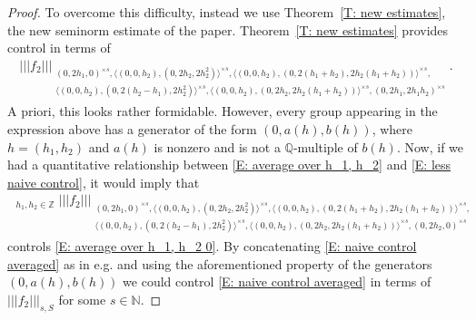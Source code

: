 \documentclass[11pt]{amsart}
\theoremstyle{definition}
\DeclareMathOperator*{\oE}{\overline{\mathbb{E}}}
\newcommand{\N}{{\mathbb N}}
\newcommand{\Q}{{\mathbb Q}}
\newcommand{\Z}{{\mathbb Z}}
\newcommand{\nnorm}[1]{\lvert\!|\!| #1|\!|\!\rvert}
\newcommand{\1}{{\mathbf{1}}}
\begin{document}
\begin{proof}
      To overcome this difficulty, instead we use Theorem~\ref{T: new estimates}, the new seminorm estimate of the paper.  Theorem~\ref{T: new estimates} provides control in terms of
    \begin{align}\label{E: less naive control}
        \nnorm{f_2}_{\substack{(0,2h_1,0)^{\times s}, \langle (0,0,h_2), (0,2h_2,2h_2^2)\rangle^{\times s}, \langle (0,0,h_2), (0,2(h_{1}+h_{2}),2h_{2}(h_{1}+h_{2}))\rangle^{\times s},\\
        \langle (0,0,h_2), (0,{2(h_2-h_1)},2h_2^2)\rangle^{\times s}, \langle (0,0,h_2), (0,2h_{2},2h_2(h_1+h_2))\rangle^{\times s}, (0,2h_1,2h_1h_2)^{\times s}}}.
    \end{align}
    A priori, this looks rather formidable. However, every group appearing in the expression above has a generator of the form $(0,a(h),b(h))$, where $h=(h_{1},h_{2})$ and $a(h)$ is nonzero and is not a $\Q$-multiple of $b(h)$. Now, if we had a quantitative relationship between \eqref{E: average over h_1, h_2} and \eqref{E: less naive control}, it would imply that
    \begin{align}\label{E: naive control averaged}
\oE_{h_1, h_2\in \Z}\nnorm{f_2}_{\substack{(0,2h_1,0)^{\times s}, \langle (0,0,h_2), (0,2h_2,2h_2^2)\rangle^{\times s}, \langle (0,0,h_2), (0,2(h_{1}+h_{2}),2h_{2}(h_{1}+h_{2}))\rangle^{\times s},\\
        \langle (0,0,h_2), (0,{2(h_2-h_1)},2h_2^2)\rangle^{\times s}, \langle (0,0,h_2), (0,2h_{2},2h_2(h_1+h_2))\rangle^{\times s}, (0,2h_2,{0})^{\times s}}}
    \end{align}
    controls \eqref{E: average over h_1, h_2 0}. By concatenating \eqref{E: naive control averaged} as in e.g. \cite{DFKS22, DKKST24} and using the aforementioned property of the generators $(0,a(h),b(h))$ we could control \eqref{E: naive control averaged} in terms of $\nnorm{f_2}_{s, S}$ for some $s\in\N$. 


\end{proof}
\end{document}
